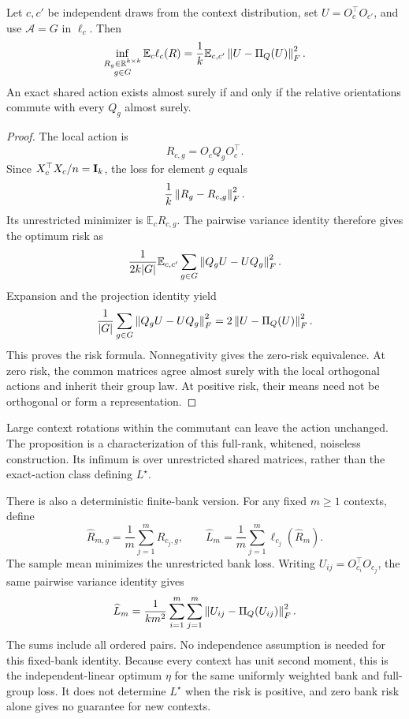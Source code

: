 \begin{proposition}
\label{prop:commutant}
Let $c,c'$ be independent draws from the context
distribution, set $U=O_c^\top O_{c'}$, and use
$\mathcal A=G$ in $\ell_c$.
Then
\[
 \inf_{\substack{R_g\in\mathbb{R}^{k\times k}\\g\in G}}
 \mathbb E_c\ell_c(R)
 =
 \frac1k
 \mathbb E_{c,c'}
 \left\lVert U-\Pi_Q(U)\right\rVert_F^2.
\]
An exact shared action exists almost surely if and only
if the relative orientations commute with every $Q_g$
almost surely.
\end{proposition}

\begin{proof}
The local action is
\[
 R_{c,g}=O_cQ_gO_c^\top.
\]
Since $X_c^\top X_c/n=\mathbf{I}_k$, the loss for element $g$
equals
\[
 \frac1k\left\lVert R_g-R_{c,g}\right\rVert_F^2.
\]
Its unrestricted minimizer is
$\mathbb E_cR_{c,g}$.
The pairwise variance identity therefore gives the
optimum risk as
\[
 \frac1{2k|G|}
 \mathbb E_{c,c'}
 \sum_{g\in G}\left\lVert Q_gU-UQ_g\right\rVert_F^2.
\]
Expansion and the projection identity yield
\[
 \frac1{|G|}
 \sum_{g\in G}\left\lVert Q_gU-UQ_g\right\rVert_F^2
 =
 2\left\lVert U-\Pi_Q(U)\right\rVert_F^2.
\]
This proves the risk formula.
Nonnegativity gives the zero-risk equivalence.
At zero risk, the common matrices agree almost surely
with the local orthogonal actions and inherit their
group law.
At positive risk, their means need not be orthogonal
or form a representation.
\end{proof}

Large context rotations within the commutant can leave
the action unchanged.
The proposition is a characterization of this
full-rank, whitened, noiseless construction.
Its infimum is over unrestricted shared matrices,
rather than the exact-action class defining $L^\star$.

There is also a deterministic finite-bank version.
For any fixed $m\geq1$ contexts, define
\[
 \widehat R_{m,g}
 =\frac1m\sum_{j=1}^mR_{c_j,g},
 \qquad
 \widehat L_m
 =\frac1m\sum_{j=1}^m\ell_{c_j}(\widehat R_m).
\]
The sample mean minimizes the unrestricted bank loss.
Writing $U_{ij}=O_{c_i}^\top O_{c_j}$, the same pairwise
variance identity gives
\[
 \widehat L_m
 =
 \frac1{km^2}
 \sum_{i=1}^m\sum_{j=1}^m
 \left\lVert U_{ij}-\Pi_Q(U_{ij})\right\rVert_F^2.
\]
The sums include all ordered pairs.
No independence assumption is needed for this fixed-bank
identity.
Because every context has unit second moment, this is
the independent-linear optimum $\eta$ for the same
uniformly weighted bank and full-group loss.
It does not determine $L^\star$ when the risk is positive,
and zero bank risk alone gives no guarantee for new
contexts.

